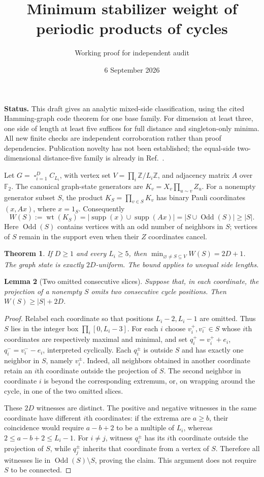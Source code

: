 \documentclass[10pt]{article}
\title{Minimum stabilizer weight of periodic products of cycles}
\author{Working proof for independent audit}
\date{6 September 2026}
\newtheorem{theorem}{Theorem}
\newtheorem{lemma}[theorem]{Lemma}
\newcommand{\Odd}{\operatorname{Odd}}
\newcommand{\supp}{\operatorname{supp}}
\newcommand{\wt}{\operatorname{wt}}
\newcommand{\F}{\mathbb F_2}
\begin{document}
\maketitle
\noindent\textbf{Status.} This draft gives an analytic mixed-side classification, using the cited Hamming-graph code theorem for one base family. For dimension at least three, one side of length at least five suffices for full distance and singleton-only minima. All new finite checks are independent corroboration rather than proof dependencies. Publication novelty has not been established; the equal-side two-dimensional distance-five family is already in Ref.~\cite{kovalev2011}.

Let $G=\mathop{\square}_{i=1}^D C_{L_i}$, with vertex set $V=\prod_i\mathbb Z/L_i\mathbb Z$, and adjacency matrix $A$ over $\F$. The canonical graph-state generators are $K_v=X_v\prod_{u\sim v}Z_u$. For a nonempty generator subset $S$, the product $K_S=\prod_{v\in S}K_v$ has binary Pauli coordinates $(x,Ax)$, where $x=1_S$. Consequently
\begin{equation}\label{eq:weight}
 W(S):=\wt(K_S)=|\supp(x)\cup\supp(Ax)|=|S\cup\Odd(S)|\ge |S|.
\end{equation}
Here $\Odd(S)$ contains vertices with an odd number of neighbors in $S$; vertices of $S$ remain in the support even when their $Z$ coordinates cancel.

\begin{theorem}\label{thm:main}
If $D\ge1$ and every $L_i\ge5$, then $\min_{\varnothing\ne S\subseteq V}W(S)=2D+1$. The graph state is exactly $2D$-uniform. The bound applies to unequal side lengths.
\end{theorem}

\begin{lemma}[Two omitted consecutive slices]\label{lem:gaps}
Suppose that, in each coordinate, the projection of a nonempty $S$ omits two consecutive cycle positions. Then $W(S)\ge |S|+2D$.
\end{lemma}
\begin{proof}
Relabel each coordinate so that positions $L_i-2,L_i-1$ are omitted. Thus $S$ lies in the integer box $\prod_i[0,L_i-3]$. For each $i$ choose $v_i^+,v_i^-\in S$ whose $i$th coordinates are respectively maximal and minimal, and set $q_i^+=v_i^++e_i$, $q_i^-=v_i^--e_i$, interpreted cyclically. Each $q_i^\pm$ is outside $S$ and has exactly one neighbor in $S$, namely $v_i^\pm$. Indeed, all neighbors obtained in another coordinate retain an $i$th coordinate outside the projection of $S$. The second neighbor in coordinate $i$ is beyond the corresponding extremum, or, on wrapping around the cycle, in one of the two omitted slices.

These $2D$ witnesses are distinct. The positive and negative witnesses in the same coordinate have different $i$th coordinates: if the extrema are $a\ge b$, their coincidence would require $a-b+2$ to be a multiple of $L_i$, whereas $2\le a-b+2\le L_i-1$. For $i\ne j$, witness $q_i^\pm$ has its $i$th coordinate outside the projection of $S$, while $q_j^\pm$ inherits that coordinate from a vertex of $S$. Therefore all witnesses lie in $\Odd(S)\setminus S$, proving the claim. This argument does not require $S$ to be connected.
\end{proof}
\end{document}
